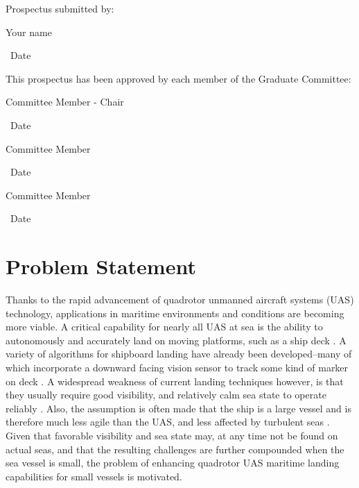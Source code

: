 \documentclass[12pt, letterpaper]{article}
\begin{document}
\hspace*{.47in}
\begin{minipage}[c]{5.25in}

\normalsize

Prospectus submitted by:

\vspace{.5in}

\makebox[2in]{\hrulefill} \hspace{1in} \makebox[2in]{\hrulefill}

\parbox[b]{3in}{Your name} \, Date
\vspace{0.5in}

This prospectus has been approved by each member of the Graduate Committee:
\vspace{0.5in}

\makebox[2in]{\hrulefill} \hspace{1in} \makebox[2in]{\hrulefill}

\parbox[b]{3in}{Committee Member - Chair} \, Date
\vspace{0.4in}

\makebox[2in]{\hrulefill} \hspace{1in} \makebox[2in]{\hrulefill}

\parbox[b]{3in}{Committee Member} \, Date
\vspace{0.4in}

\makebox[2in]{\hrulefill} \hspace{1in} \makebox[2in]{\hrulefill}

\parbox[b]{3in}{Committee Member} \, Date

\end{minipage}

\vspace*{\fill}

\pagebreak

\setcounter{page}{1}

\section{Problem Statement}

Thanks to the rapid advancement of quadrotor unmanned aircraft systems (UAS) technology, applications in maritime environments and conditions are becoming more viable.  A critical capability for nearly all UAS at sea is the ability to autonomously and accurately land on moving platforms, such as a ship deck \cite{Herisse2012}.  A variety of algorithms for shipboard landing have already been developed--many of which incorporate a downward facing vision sensor to track some kind of marker on deck \cite{Truskin2013} \cite{Kong2014}.  A widespread weakness of current landing techniques however, is that they usually require good visibility, and relatively calm sea state to operate reliably \cite{Tan2016}. Also, the assumption is often made that the ship is a large vessel and is therefore much less agile than the UAS, and less affected by turbulent seas \cite{Ling2014}.  Given that favorable visibility and sea state may, at any time not be found on actual seas, and that the resulting challenges are further compounded when the sea vessel is small, the problem of enhancing quadrotor UAS maritime landing capabilities for small vessels is motivated.  
\end{document}
